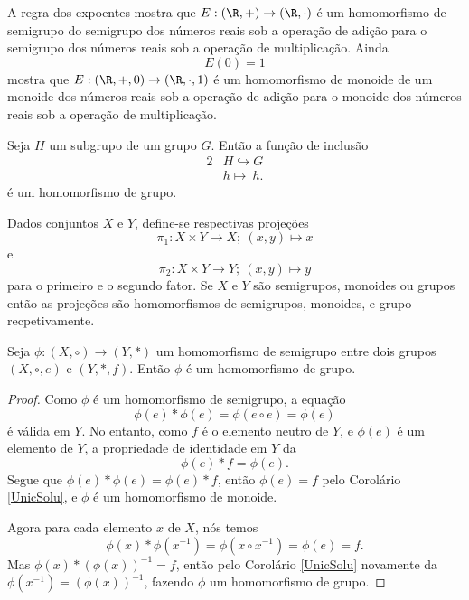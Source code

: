          \begin{exmp}
            A regra dos expoentes mostra que $E: (\R, +) \to (\R,\cdot)$ é um homomorfismo de semigrupo do semigrupo dos números reais sob a operação de adição para o semigrupo dos números reais sob a operação de multiplicação. Ainda $$E(0)=1$$ mostra que $E: (\R,+,0) \to (\R,\cdot,1)$ é um homomorfismo de monoide de um monoide dos números reais sob a operação de adição para o monoide dos números reais sob a operação de multiplicação.
         \end{exmp}
         \begin{exmp}
            Seja $H$ um subgrupo de um grupo $G$. Então a função de inclusão
            \begin{alignat}{2}
               &H \hookrightarrow G \nonumber\\
               &h \mapsto\ h.
               \nonumber
            \end{alignat}
            é um homomorfismo de grupo.
         \end{exmp}
         \begin{exmp}
            Dados conjuntos $X$ e $Y$, define-se respectivas projeções
            $$\pi_{1}: X\times Y \to X;\ (x,y)\mapsto x$$ e $$\pi_{2}: X\times Y \to Y;\ (x,y)\mapsto y$$
            para o primeiro e o segundo fator. Se $X$ e $Y$ são semigrupos, monoides ou grupos então as projeções são homomorfismos de semigrupos, monoides, e grupo recpetivamente.
         \end{exmp}

         \begin{stat}
            Seja $\phi: (X,\circ) \to (Y,*)$ um homomorfismo de semigrupo entre dois grupos $(X,\circ,e)$ e $(Y,*,f)$. Então $\phi$ é um homomorfismo de grupo.
            \begin{proof}
               Como $\phi$ é um homomorfismo de semigrupo, a equação
               $$\phi(e)*\phi(e) = \phi(e\circ e)=\phi(e)$$
               é válida em $Y$. No entanto, como $f$ é o elemento neutro de $Y$, e $\phi(e)$ é um elemento de $Y$, a propriedade de identidade em $Y$ da $$\phi(e)*f=\phi(e).$$
               Segue que $\phi(e)*\phi(e)=\phi(e)*f$, então $\phi(e) =f$ pelo Corolário \ref{UnicSolu}, e $\phi$ é um homomorfismo de monoide.

               Agora para cada elemento $x$ de $X$, nós temos $$\phi(x)*\phi(x^{-1})=\phi(x\circ x^{-1}) = \phi(e)=f.$$
               Mas $\phi(x)*(\phi(x))^{-1} = f$, então pelo Corolário \ref{UnicSolu} novamente da $\phi(x^{-1})=(\phi(x))^{-1}$, fazendo $\phi$ um homomorfismo de grupo.
            \end{proof}
         \end{stat}

